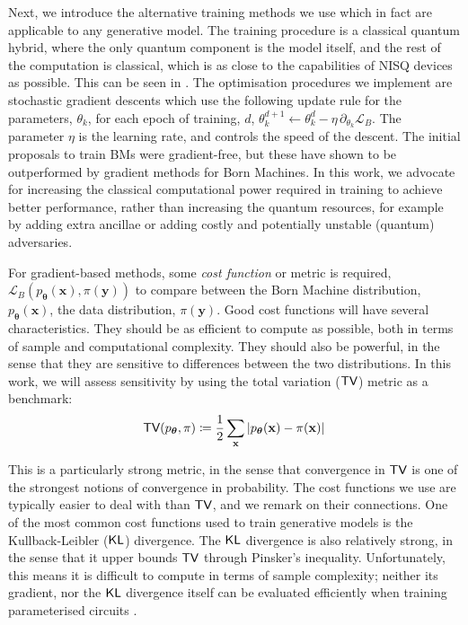 Next, we introduce the alternative training methods we use which in fact are applicable to any generative model. The training procedure is a classical quantum hybrid, where the only quantum component is the model itself, and the rest of the computation is classical, which is as close to the capabilities of NISQ devices as possible. This can be seen in . The optimisation procedures we implement are stochastic gradient descents which use the following update rule for the parameters, $\theta_k$, for each epoch of training, $d$, $\theta^{d+1}_k \leftarrow \theta_k^{d} - \eta\, \partial_{\theta_k}\mathcal{L}_B$. The parameter $\eta$ is the learning rate, and controls the speed of the descent. The initial proposals to train BMs were gradient-free\cite{benedetti_generative_2019, leyton-ortega_robust_2019}, but these %
have shown to be outperformed by gradient methods for Born Machines\cite{liu_differentiable_2018, du_expressive_2018}. In this work, we advocate for increasing the classical computational power required in training to achieve better performance, rather than increasing the quantum resources, for example by adding extra ancillae\cite{du_expressive_2018} or adding costly and potentially unstable (quantum) adversaries\cite{zeng_learning_2018, lloyd_quantum_2018, dallaire-demers_quantum_2018}. 

For gradient-based methods, some \textit{cost function} or metric is required, $\mathcal{L}_B\left(p_{\boldsymbol\theta}(\mathbf{x}), \pi(\mathbf{y})\right)$ to compare between the Born Machine distribution, $p_{\boldsymbol\theta}(\mathbf{x})$, the data distribution, $\pi(\mathbf{y})$. Good cost functions will have several characteristics. They should be as efficient to compute as possible, both in terms of sample and computational complexity. They should also be powerful, in the sense that they are sensitive to differences between the two distributions. In this work, we will assess sensitivity by using %
the total variation ($\operatorname{\textsf{TV}}$) metric as a benchmark:
\begin{align}
    \operatorname{\textsf{TV}}(p_{\boldsymbol\theta}, \pi) \coloneqq \frac{1}{2}\sum_{\mathbf{x}}|p_{\boldsymbol\theta}(\mathbf{x}) - \pi(\mathbf{x})| \label{total_variation}
\end{align}

\noindent This is a particularly strong metric, in the sense that convergence in $\operatorname{\textsf{TV}}$ is one of the strongest notions of convergence in probability. The cost functions we use are typically easier to deal with than $\operatorname{\textsf{TV}}$, and we remark on their connections. One of the most common cost functions used to train generative models is the Kullback-Leibler ($\operatorname{\textsf{KL}}$) divergence. The $\operatorname{\textsf{KL}}$ divergence is also relatively strong, in the sense that it upper bounds $\operatorname{\textsf{TV}}$ through Pinsker's inequality. Unfortunately, this means it is difficult to compute in terms of sample complexity; neither its gradient, nor the $\operatorname{\textsf{KL}}$ divergence itself can be evaluated efficiently when training parameterised circuits \cite{liu_differentiable_2018}.

